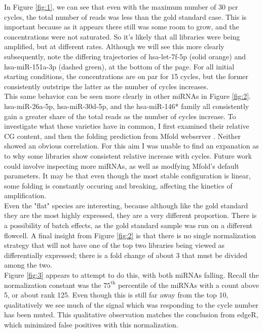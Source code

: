 \documentclass{bioinfo}
\begin{document}
In Figure \ref{fig:1}, we can see that even with the maximum number of 30 pcr cycles, the total number of reads was less than the gold standard case. This is important because as it appears there still was some room to grow, and the concentrations were not saturated. So it's likely that all libraries were being amplified, but at different rates. Although we will see this more clearly subsequently, note the differing trajectories of hsa-let-7f-5p (solid orange) and hsa-miR-151a-3p (dashed green), at the bottom of the page. For all initial starting conditions, the concentrations are on par for 15 cycles, but the former consistently outstrips the latter as the number of cycles increases. \vspace{4pt} \\
This same behavior can be seen more clearly in other miRNAs in Figure \ref{fig:2}. hsa-miR-26a-5p, hsa-miR-30d-5p, and the hsa-miR-146* family all consistently gain a greater share of the total reads as the number of cycles increase. To investigate what  these varieties have in common, I first examined their relative CG content, and then the folding prediction from Mfold webserver \citep{Zuker03}. Neither showed an obvious correlation.  For this aim I was unable to find an expanation as to why some libraries show consistent relative increase with cycles. Future work could involve inspecting more miRNAs, as well as modfying Mfold's default parameters. It may be that even though the most stable configuration is linear, some folding is constantly occuring and breaking, affecting the kinetics of amplification. \vspace{4pt} \\
Even the "flat" species are interesting, because although like the gold standard they are the most highly expressed, they are a very different proportion. There is a possibility of batch effects, as the gold standard sample was run on a different flowcell. A final insight from Figure \ref{fig:2} is that there is no single normalization strategy that will not have one of the top two libraries being viewed as differentially expressed; there is a fold change of about 3 that must be divided among the two.  \vspace{4pt} \\
Figure \ref{fig:3} appears to attempt to do this, with both miRNAs falling. Recall the normalization constant was the $75^{\text{th}}$ percentile of the miRNAs with a count above 5, or about rank 125. Even though this is still far away from the top 10, qualitatively we see much of the signal which was responding to the cycle number has been muted. This qualitative observation matches the conclusion from edgeR, which minimized false positives with this normalization. \vspace{4pt} \\
\end{document}

